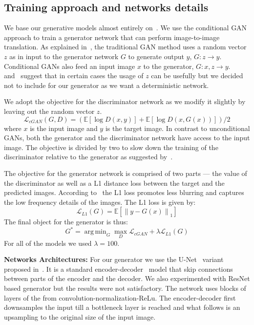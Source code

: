 \documentclass{llncs}
\DeclareMathOperator*{\argminA}{arg\,min}
\begin{document}
\subsection{Training approach and networks details}
We base our generative models almost entirely on~\cite{pix2pix}. We use the conditional GAN approach to train a generator network that can perform image-to-image translation. As explained in~\cite{pix2pix}, the traditional GAN method uses a random vector $z$ as in input to the generator network $G$ to generate output $y$, $G:z \rightarrow y$. Conditional GANs also feed an input image $x$ to the generator, $G: x,z \rightarrow y$.~\cite{pix2pix} and~\cite{wang2016} suggest that in certain cases the usage of $z$ can be usefully but we decided not to include for our generator as we want a deterministic network.

We adopt the objective for the discriminator network as we modify it slightly by leaving out the random vector $z$.
\begin{equation}
\mathcal{L}_{cGAN} (G, D) = (\mathbb{E}[\log D (x,y)] + \mathbb{E}[\log D (x, G(x))])/2
\end{equation}
where $x$ is the input image and $y$ is the target image. In contrast to unconditional GANs, both the generator and the discriminator network have access to the input image. The objective is divided by two to slow down the training of the discriminator relative to the generator as suggested by~\cite{pix2pix}.

The objective for the generator network is comprised of two parts --- the value of the discriminator as well as a L1 distance loss between the target and the predicted images. According to~\cite{pix2pix} the L1 loss promotes less blurring and captures the low frequency details of the images. The L1 loss is given by:
\begin{equation}
\mathcal{L}_{L1} (G) = \mathbb{E}[\left\lVert y - G(x)\right\rVert_1]
\end{equation}
The final object for the generator is thus:
\begin{equation}
G^* = \argminA_G \max_D \mathcal{L}_{cGAN}  + \lambda \mathcal{L}_{L1} (G)
\end{equation}
For all of the models we used $\lambda = 100$.

\noindent\textbf{Networks Architectures:} For our generator we use the U-Net~\cite{ronneberger2015} variant proposed in~\cite{pix2pix}. It is a standard encoder-decoder~\cite{hinton2006} model that skip connections between parts of the encoder and the decoder. We also experimented with ResNet based generator but the results were not satisfactory. The network uses blocks of layers of the from convolution-normalization-ReLu. The encoder-decoder first downsamples the input till a bottleneck layer is reached and what follows is an upsampling to the original size of the input image.
\end{document}
